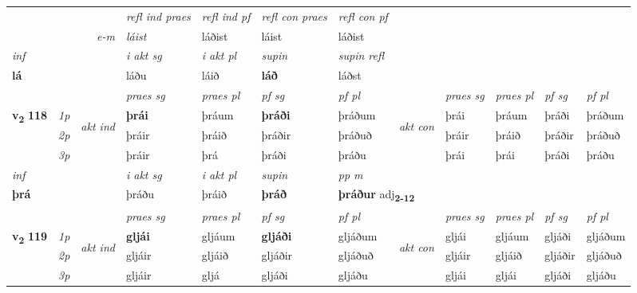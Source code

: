 \begin{longtable}[l]{X>{\footnotesize\itshape}llXXXXlXXXX}
 & && \textit{refl ind praes} & \textit{refl ind pf} & \textit{refl con praes} & \textit{refl con pf} \\*
\multicolumn{3}{r}{\textit{e-m}}& láist & láðist & láist & láðist \\*

\cmidrule{4-7}
   {\textit{inf}} & &  & \textit{i akt sg} & \textit{i akt pl}    & \textit{supin} & \textit{supin refl}  \\*
  {\textbf{lá}} & && láðu  & láið    &  \textbf{láð} & láðst  \\*

\midrule

 & &   & \textit{praes sg}  & \textit{praes pl}    & \textit{ pf sg} & \textit{pf pl} & & \textit{praes sg}  & \textit{praes pl}    & \textit{pf sg} & \textit{pf pl }  \\ \cmidrule{4-7} \cmidrule{9-12}
 \multirow{2}{*}{{{\textbf{v{\textsubscript{2}}} \Large{\textbf{118}}}}}  & 1p & \multirow{3}{*}{\begin{turn}{90}\textit{akt ind}\end{turn}} & \textbf{þrái} & þráum & \textbf{þráði} & þráðum & \multirow{3}{*}{\begin{turn}{90}\textit{akt con}\end{turn}} &þrái & þráum & þráði & þráðum\\*
 & 2p &  &  þráir  & þráið & þráðir & þráðuð & & þráir & þráið & þráðir & þráðuð \\*
 & 3p &  & þráir & þrá & þráði & þráðu & & þrái & þrái& þráði & þráðu \\*
\cmidrule{4-7} \cmidrule{9-12}

   {\textit{inf}} & &  & \textit{i akt sg} & \textit{i akt pl}    & \textit{supin}  & \textit{pp m} \\*
  {\textbf{þrá}} & && þráðu  & þráið    &  \textbf{þráð}  & \multicolumn{2}{l}{\textbf{þráður} adj\textbf{\textsubscript{2-12}}} \\*

\midrule

 & &   & \textit{praes sg}  & \textit{praes pl}    & \textit{ pf sg} & \textit{pf pl} & & \textit{praes sg}  & \textit{praes pl}    & \textit{pf sg} & \textit{pf pl }  \\ \cmidrule{4-7} \cmidrule{9-12}
 \multirow{2}{*}{{{\textbf{v{\textsubscript{2}}} \Large{\textbf{119}}}}}  & 1p & \multirow{3}{*}{\begin{turn}{90}\textit{akt ind}\end{turn}} & \textbf{gljái} & gljáum & \textbf{gljáði} & gljáðum & \multirow{3}{*}{\begin{turn}{90}\textit{akt con}\end{turn}} &gljái & gljáum & gljáði & gljáðum\\*
 & 2p &  &  gljáir  & gljáið & gljáðir & gljáðuð & & gljáir & gljáið & gljáðir & gljáðuð \\*
 & 3p &  & gljáir & gljá & gljáði & gljáðu & & gljái & gljái& gljáði & gljáðu \\*
\cmidrule{4-7} \cmidrule{9-12}


\end{longtable}
